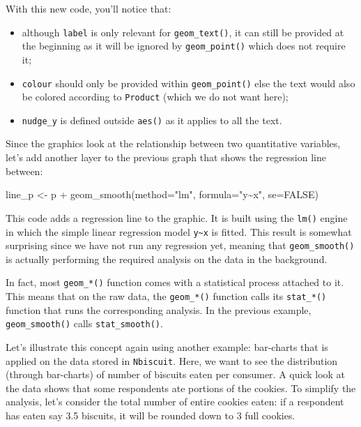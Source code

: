 \documentclass[
]{book}
\newenvironment{Shaded}{\begin{snugshade}}{\end{snugshade}}
\newcommand{\AttributeTok}[1]{\textcolor[rgb]{0.77,0.63,0.00}{#1}}
\newcommand{\ConstantTok}[1]{\textcolor[rgb]{0.00,0.00,0.00}{#1}}
\newcommand{\FunctionTok}[1]{\textcolor[rgb]{0.00,0.00,0.00}{#1}}
\newcommand{\NormalTok}[1]{#1}
\newcommand{\OtherTok}[1]{\textcolor[rgb]{0.56,0.35,0.01}{#1}}
\newcommand{\SpecialCharTok}[1]{\textcolor[rgb]{0.00,0.00,0.00}{#1}}
\newcommand{\StringTok}[1]{\textcolor[rgb]{0.31,0.60,0.02}{#1}}
\providecommand{\tightlist}{%
  \setlength{\itemsep}{0pt}\setlength{\parskip}{0pt}}
\begin{document}
With this new code, you'll notice that:

\begin{itemize}
\tightlist
\item
  although \texttt{label} is only relevant for \texttt{geom\_text()}, it can still be provided at the beginning as it will be ignored by \texttt{geom\_point()} which does not require it;
\item
  \texttt{colour} should only be provided within \texttt{geom\_point()} else the text would also be colored according to \texttt{Product} (which we do not want here);
\item
  \texttt{nudge\_y} is defined outside \texttt{aes()} as it applies to all the text.
\end{itemize}

Since the graphics look at the relationship between two quantitative variables, let's add another layer to the previous graph that shows the regression line between:

\begin{Shaded}
\begin{Highlighting}[]
\NormalTok{line\_p }\OtherTok{\textless{}{-}}\NormalTok{ p }\SpecialCharTok{+} \FunctionTok{geom\_smooth}\NormalTok{(}\AttributeTok{method=}\StringTok{"lm"}\NormalTok{, }\AttributeTok{formula=}\StringTok{"y\textasciitilde{}x"}\NormalTok{, }\AttributeTok{se=}\ConstantTok{FALSE}\NormalTok{)}
\end{Highlighting}
\end{Shaded}

This code adds a regression line to the graphic. It is built using the \texttt{lm()} engine in which the simple linear regression model \texttt{y\textasciitilde{}x} is fitted. This result is somewhat surprising since we have not run any regression yet, meaning that \texttt{geom\_smooth()} is actually performing the required analysis on the data in the background.

In fact, most \texttt{geom\_*()} function comes with a statistical process attached to it. This means that on the raw data, the \texttt{geom\_*()} function calls its \texttt{stat\_*()} function that runs the corresponding analysis. In the previous example, \texttt{geom\_smooth()} calls \texttt{stat\_smooth()}.

Let's illustrate this concept again using another example: bar-charts that is applied on the data stored in \texttt{Nbiscuit}.
Here, we want to see the distribution (through bar-charts) of number of biscuits eaten per consumer. A quick look at the data shows that some respondents ate portions of the cookies. To simplify the analysis, let's consider the total number of entire cookies eaten: if a respondent has eaten say 3.5 biscuits, it will be rounded down to 3 full cookies.
\end{document}
